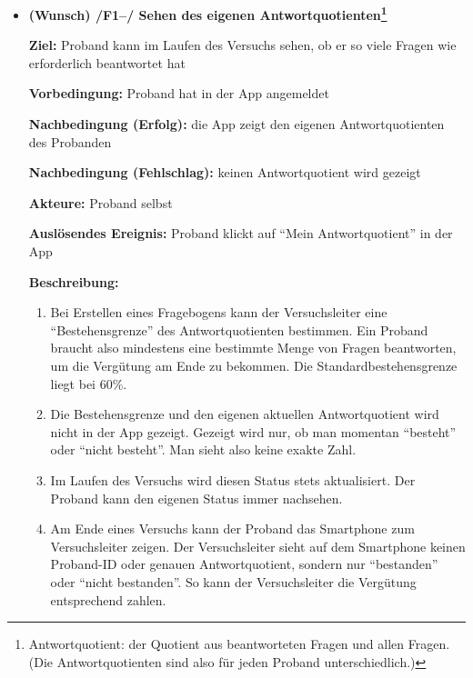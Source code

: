 \documentclass[a4paper]{scrreprt}
\begin{document}
\begin{itemize}
            
            \item \textbf{(Wunsch) /F1--/ Sehen des eigenen Antwortquotienten\footnote{Antwortquotient: der Quotient aus beantworteten Fragen und allen Fragen. (Die Antwortquotienten sind also für jeden Proband unterschiedlich.)}}
            
            \par \textbf{Ziel: }Proband kann im Laufen des Versuchs sehen, ob er so viele Fragen wie erforderlich beantwortet hat
            \par \textbf{Vorbedingung: }Proband hat in der App angemeldet
            \par \textbf{Nachbedingung (Erfolg): }die App zeigt den eigenen Antwortquotienten des Probanden
            \par \textbf{Nachbedingung (Fehlschlag): }keinen Antwortquotient wird gezeigt
            \par \textbf{Akteure: }Proband selbst
            \par \textbf{Auslösendes Ereignis: }Proband klickt auf “Mein Antwortquotient” in der App
            \par \textbf{Beschreibung: }
                \begin{enumerate}
                    \item Bei Erstellen eines Fragebogens kann der Versuchsleiter eine “Bestehensgrenze” des Antwortquotienten bestimmen. Ein Proband braucht also mindestens eine bestimmte Menge von Fragen beantworten, um die Vergütung am Ende zu bekommen. Die Standardbestehensgrenze liegt bei 60\%.
                    \item Die Bestehensgrenze und den eigenen aktuellen Antwortquotient wird nicht in der App gezeigt. Gezeigt wird nur, ob man momentan “besteht” oder “nicht besteht”. Man sieht also keine exakte Zahl.
                    \item Im Laufen des Versuchs wird diesen Status stets aktualisiert. Der Proband kann den eigenen Status immer nachsehen.
                    \item Am Ende eines Versuchs kann der Proband das Smartphone zum Versuchsleiter zeigen. Der Versuchsleiter sieht auf dem Smartphone keinen Proband-ID oder genauen Antwortquotient, sondern nur “bestanden” oder “nicht bestanden”. So kann der Versuchsleiter die Vergütung entsprechend zahlen.
                \end{enumerate}

        \end{itemize}
\end{document}
